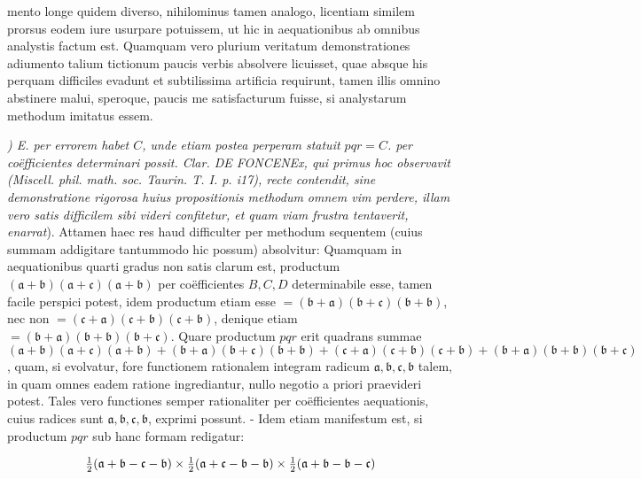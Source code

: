 \documentclass[twoside,12pt, showframe]{memoir}
\let\oldfrac\frac
\def\frac#1#2{\mathchoice{\tfrac{#1}{#2}}{\oldfrac{#1}{#2}}{\genfrac{}{}{}{2}{#1}{#2\mathstrut}}{\genfrac{}{}{}{3}{#1}{#2\mathstrut}}}
\begin{document}
mento longe quidem diverso, nihilominus tamen analogo, licentiam similem prorsus eodem iure usurpare potuissem, ut hic in aequationibus ab omnibus analystis factum est. Quamquam vero plurium veritatum demonstrationes adiumento talium tictionum paucis verbis absolvere licuisset, quae absque his perquam difficiles evadunt et subtilissima artificia requirunt, tamen illis omnino abstinere malui, speroque, paucis me satisfacturum fuisse, si analystarum methodum imitatus essem.

\textit{) E. per errorem habet \(C\), unde etiam postea perperam statuit \(p q r=C\).
per coëfficientes determinari possit. Clar. DE FONCENEx, qui primus hoc observavit (Miscell. phil. math. soc. Taurin. T. I. p. i17), recte contendit, sine demonstratione rigorosa huius propositionis methodum omnem vim perdere, illam vero satis difficilem sibi videri confitetur, et quam viam frustra tentaverit, enarrat}). Attamen haec res haud difficulter per methodum sequentem (cuius summam addigitare tantummodo hic possum) absolvitur: Quamquam in aequationibus quarti gradus non satis clarum est, productum \((\mathfrak{a}+\mathfrak{b})(\mathfrak{a}+\mathfrak{c})(\mathfrak{a}+\mathfrak{b})\) per coëfficientes \(B, C, D\) determinabile esse, tamen facile perspici potest, idem productum etiam esse \(=(\mathfrak{b}+\mathfrak{a})(\mathfrak{b}+\mathfrak{c})(\mathfrak{b}+\mathfrak{b})\), nec non \(=(\mathfrak{c}+\mathfrak{a})(\mathfrak{c}+\mathfrak{b})(\mathfrak{c}+\mathfrak{b})\), denique etiam \(=(\mathfrak{b}+\mathfrak{a})(\mathfrak{b}+\mathfrak{b})(\mathfrak{b}+\mathfrak{c})\). Quare productum \(p q r\) erit quadrans summae \((\mathfrak{a}+\mathfrak{b})(\mathfrak{a}+\mathfrak{c})(\mathfrak{a}+\mathfrak{b})+(\mathfrak{b}+\mathfrak{a})(\mathfrak{b}+\mathfrak{c})(\mathfrak{b}+\mathfrak{b})+(\mathfrak{c}+\mathfrak{a})(\mathfrak{c}+\mathfrak{b})(\mathfrak{c}+\mathfrak{b})+(\mathfrak{b}+\mathfrak{a})(\mathfrak{b}+\mathfrak{b})(\mathfrak{b}+\mathfrak{c})\), quam, si evolvatur, fore functionem rationalem integram radicum \(\mathfrak{a}, \mathfrak{b}, \mathfrak{c}, \mathfrak{b}\) talem, in quam omnes eadem ratione ingrediantur, nullo negotio a priori praevideri potest. Tales vero functiones semper rationaliter per coëfficientes aequationis, cuius radices sunt \(\mathfrak{a}, \mathfrak{b}, \mathfrak{c}, \mathfrak{b}\), exprimi possunt. - Idem etiam manifestum est, si productum \(p q r\) sub hanc formam redigatur:

\[
\frac{1}{2}(\mathfrak{a}+\mathfrak{b}-\mathfrak{c}-\mathfrak{b}) \times \frac{1}{2}(\mathfrak{a}+\mathfrak{c}-\mathfrak{b}-\mathfrak{b}) \times \frac{1}{2}(\mathfrak{a}+\mathfrak{b}-\mathfrak{b}-\mathfrak{c})
\]
\end{document}
